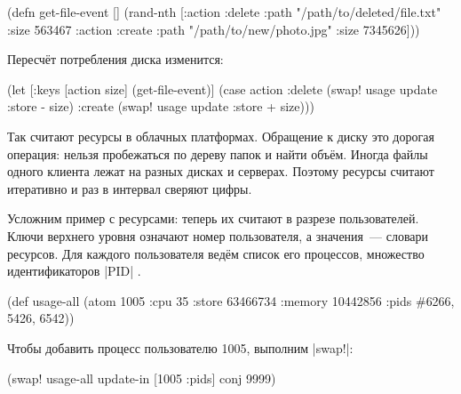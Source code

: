 \begin{english}
  \begin{clojure}
(defn get-file-event []
  (rand-nth
   [{:action :delete
     :path "/path/to/deleted/file.txt"
     :size 563467}
    {:action :create
     :path "/path/to/new/photo.jpg"
     :size 7345626}]))
  \end{clojure}
\end{english}

\noindent
Пересчёт потребления диска изменится:

\begin{english}
  \begin{clojure}
(let [{:keys [action size]} (get-file-event)]
  (case action
    :delete
    (swap! usage update :store - size)
    :create
    (swap! usage update :store + size)))
  \end{clojure}
\end{english}


Так считают ресурсы в облачных платформах. Обращение к диску это дорогая
операция: нельзя пробежаться по дереву папок и найти объём. Иногда файлы
одного клиента лежат на разных дисках и серверах. Поэтому ресурсы считают
итеративно и раз в интервал сверяют цифры.


Усложним пример с ресурсами: теперь их считают в разрезе пользователей. Ключи
верхнего уровня означают номер пользователя, а значения~--- словари
ресурсов. Для каждого пользователя ведём список его процессов, множество
идентификаторов \spverb|PID|
.

\begin{english}
  \begin{clojure/lines}
(def usage-all
  (atom {1005 {:cpu 35
               :store 63466734
               :memory 10442856
               :pids #{6266, 5426, 6542}}}))
  \end{clojure/lines}
\end{english}

\noindent
Чтобы добавить процесс пользователю 1005, выполним \spverb|swap!|:

\begin{english}
  \begin{clojure}
(swap! usage-all update-in [1005 :pids] conj 9999)
  \end{clojure}
\end{english}

